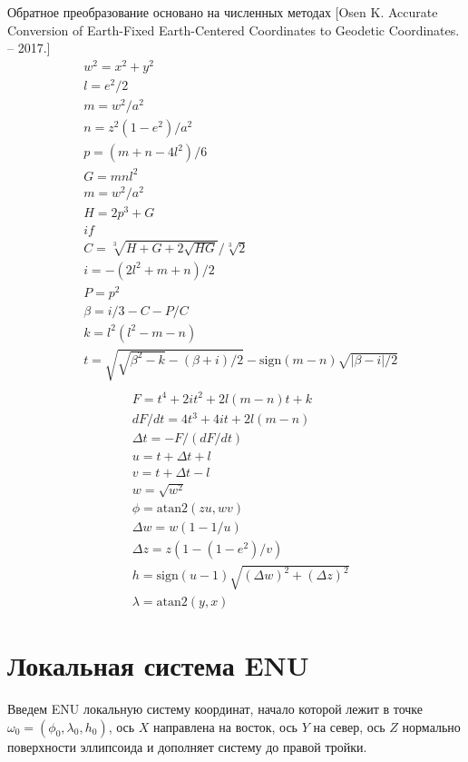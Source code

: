 \documentclass[a4paper,12pt]{article}
\begin{document}
Обратное преобразование основано на численных методах
[Osen K. Accurate Conversion of Earth-Fixed Earth-Centered Coordinates to Geodetic Coordinates. – 2017.]
\begin{align} 
&w^2 = x^2 + y^2 \\
&l = e^2 / 2 \\
&m = w^2 / a^2 \\
&n = z^2(1-e^2) / a^2 \\
&p = (m + n - 4l^2) / 6 \\
&G = mnl^2 \\&m = w^2 / a^2 \\
&H = 2p^3 + G \\
&if \\
&C = \sqrt[3]{H + G + 2 \sqrt{HG}} / \sqrt[3]{2} \\
&i = -(2l^2 + m + n) / 2 \\
&P = p^2 \\
&\beta = i/3 - C - P/C \\
&k = l^2(l^2 - m - n) \\
&t = \sqrt{\sqrt{\beta^2-k} - (\beta + i)/2} - \text{sign} (m-n) \sqrt{|\beta - i| / 2} \\
\end{align}
\begin{align} 
&F = t^4 + 2it^2 + 2l(m-n)t + k \\
&dF / dt = 4t^3 + 4it + 2l (m-n) \\
&\Delta t = -F / (dF/dt) \\
&u = t + \Delta t + l\\
&v = t + \Delta t - l\\
&w = \sqrt{w^2} \\
&\phi = \text{atan2} (zu, wv) \\
&\Delta w = w(1-1/u) \\
&\Delta z = z(1-(1 - e^2)/v) \\
&h = \text{sign} (u -1) \sqrt {(\Delta w)^2 + (\Delta z)^2} \\
&\lambda = \text{atan2} (y, x)
\end{align}

\section{Локальная система ENU}

Введем ENU локальную систему координат,
начало которой лежит в точке $\omega_0 = (\phi_0, \lambda_0, h_0)$,
ось $X$ направлена на восток,
ось $Y$ на север,
ось $Z$ нормально поверхности эллипсоида и дополняет систему до правой тройки.
\end{document}
